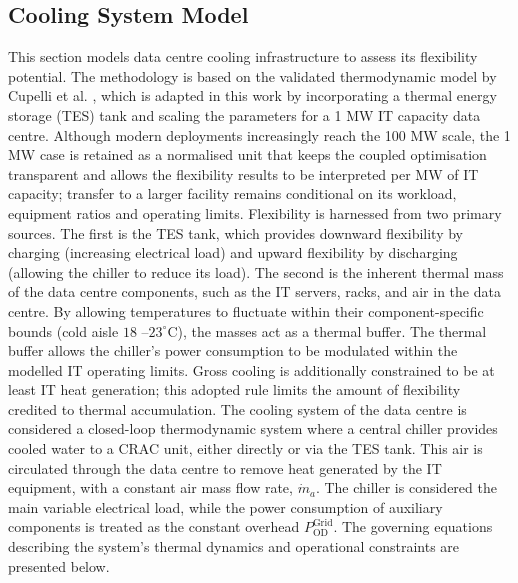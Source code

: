 \documentclass[lettersize,journal]{IEEEtran}
\providecommand{\DIFadd}[1]{{\color{blue}#1}}
\providecommand{\DIFaddbegin}{}
\providecommand{\DIFaddend}{}
\begin{document}
\subsection{Cooling System Model} \label{sec: Cooling Infrastructure Flexibility} 
This section models  \DIFaddbegin \DIFadd{data centre }\DIFaddend cooling infrastructure to assess its flexibility potential. The methodology is based on the validated thermodynamic model by Cupelli et al. \cite{cupelli2018data}, which is adapted in this work by incorporating a  \DIFaddbegin \DIFadd{thermal energy storage }\DIFaddend (TES) tank and scaling the parameters for a 1 MW IT capacity data centre. \DIFaddbegin \DIFadd{Although modern deployments increasingly reach the 100 MW scale, the 1 MW case is retained as a normalised unit that keeps the coupled optimisation transparent and allows the flexibility results to be interpreted per MW of IT capacity; transfer to a larger facility remains conditional on its workload, equipment ratios and operating limits.
}\DIFaddend Flexibility is harnessed from two primary sources. The \DIFaddbegin \DIFadd{first is the }\DIFaddend TES tank, which provides downward flexibility by charging (increasing electrical load) and upward flexibility by discharging (allowing the chiller to reduce its load). The second is the inherent thermal mass of the  \DIFaddbegin \DIFadd{data centre }\DIFaddend components, such as the IT servers, racks, and air in the  \DIFaddbegin \DIFadd{data centre}\DIFaddend . By allowing temperatures to fluctuate  \DIFaddbegin \DIFadd{within their component-specific bounds (cold aisle }\DIFaddend $18$ \DIFaddbegin \DIFadd{--$23^\circ$C)}\DIFaddend , the masses act as a thermal buffer. The thermal buffer allows the chiller's power consumption to be modulated  \DIFaddbegin \DIFadd{within the modelled IT operating limits. Gross cooling is additionally constrained to be at least IT heat generation; this adopted rule limits the amount of flexibility credited to thermal accumulation.
}\DIFaddend The cooling system of the  \DIFaddbegin \DIFadd{data centre }\DIFaddend is considered a closed-loop thermodynamic system where a central chiller provides cooled water to a CRAC unit, either directly or via the TES tank. This air is circulated through the  \DIFaddbegin \DIFadd{data centre }\DIFaddend to remove heat generated by the IT equipment, with a constant air mass flow rate, $\dot{m}_{a}$. The chiller is considered the main variable electrical load, while the power consumption of auxiliary components is treated as  \DIFaddbegin \DIFadd{the constant overhead $P^{\mathrm{Grid}}_{\mathrm{OD}}$}\DIFaddend . The governing equations describing the system's thermal dynamics and operational constraints are presented below.
\end{document}
